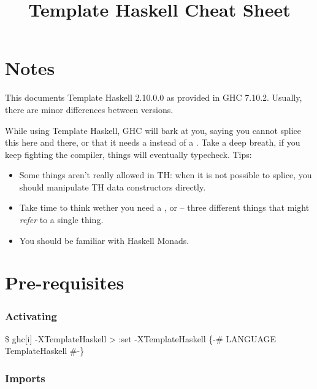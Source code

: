 \documentclass{refcard}
\title{Template Haskell Cheat Sheet}
\begin{document}
\maketitle

\section{Notes}

This documents Template Haskell 2.10.0.0 as provided in GHC 7.10.2.
Usually, there are minor differences between versions.

While using Template Haskell, GHC will bark at you,
	saying you cannot splice this here and there,
	or that it needs a  instead of a \C{[Something]}.
Take a deep breath, if you keep fighting the compiler,
	things will eventually typecheck.  Tips:
\begin{itemize}
\item
Some things aren't really allowed in TH:
	when it is not possible to splice,
	you should manipulate TH data constructors directly.

\item
Take time to think wether you need a
	,  or 
	-- three different things
	that might \emph{refer} to a single thing.

\item
You should be familiar with Haskell Monads.
\end{itemize}

\section{Pre-requisites}

\subsubsection{Activating}

\begin{ldesc}
	 \$ ghc[i] -XTemplateHaskell
	\li[GHCi]         > :set -XTemplateHaskell
	\li[pragma]       \{-\# LANGUAGE TemplateHaskell \#-\}
\end{ldesc}


\subsubsection{Imports}
\end{document}

